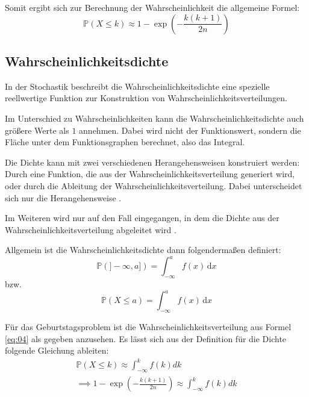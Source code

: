 \documentclass[../main.tex]{subfiles}
\begin{document}
\begin{flushleft}
        Somit ergibt sich zur Berechnung der Wahrscheinlichkeit die allgemeine Formel:
        \begin{equation}
            \mathbb{P}(X \leq k) \approx 1 - \exp( - \frac{ k (k + 1) }{ 2n } ) \label{eq:04}
        \end{equation}

        \subsection{Wahrscheinlichkeitsdichte}\label{subsec:wahrscheinlichkeitsdichte}

        In der Stochastik beschreibt die Wahrscheinlichkeitsdichte eine spezielle reellwertige Funktion zur Konstruktion von Wahrscheinlichkeitsverteilungen.

        Im Unterschied zu Wahrscheinlichkeiten kann die Wahrscheinlichkeitsdichte auch größere Werte als $1$ annehmen. Dabei wird nicht der Funktionswert, sondern die Fläche unter dem Funktionsgraphen berechnet, also das Integral.

        Die Dichte kann mit zwei verschiedenen Herangehensweisen konstruiert werden: Durch eine Funktion, die aus der Wahrscheinlichkeitsverteilung generiert wird, oder durch die Ableitung der Wahrscheinlichkeitsverteilung. Dabei unterscheidet sich nur die Herangehensweise  \cite[560ff]{henze}.

        Im Weiteren wird nur auf den Fall eingegangen, in dem die Dichte aus der Wahrscheinlichkeitsverteilung abgeleitet wird  \cite[22ff]{georgii}. \newline

        Allgemein ist die Wahrscheinlichkeitsdichte dann folgendermaßen definiert:
        \begin{equation}
            \mathbb{P}(]-\infty, a])= \int_{-\infty}^a f(x) \, \mathrm d x
        \end{equation}
        bzw.
        \begin{equation}
            \mathbb{P}(X \leq a)= \int_{-\infty}^a f(x) \,\mathrm d x
        \end{equation}

        Für das Geburtstagsproblem ist die Wahrscheinlichkeitsverteilung aus Formel \ref{eq:04} als gegeben anzusehen. Es lässt sich aus der Definition für die Dichte folgende Gleichung ableiten:
        \begin{eqnarray}
            \mathbb{P}(X \leq k) \approx \int_{ -\infty }^{ k }{ f(k) dk } \\
            \implies 1 - \exp( - \frac{ k (k + 1) }{ 2n } ) \approx \int_{ -\infty }^{ k }{ f(k) dk }
        \end{eqnarray}



\end{flushleft}
\end{document}
